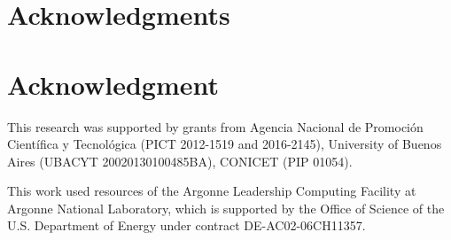 \documentclass[10pt,journal,compsoc]{IEEEtran}
\begin{document}
%





\ifCLASSOPTIONcompsoc
  \section*{Acknowledgments}
\else
  \section*{Acknowledgment}
\fi


This research was supported by grants from Agencia Nacional de Promoci\'on Cient\'ifica y Tecnol\'ogica (PICT 2012-1519 and 2016-2145), University of Buenos Aires (UBACYT 20020130100485BA), CONICET (PIP 01054).

This work used resources of the Argonne Leadership Computing Facility at Argonne National Laboratory, which is supported by the Office of Science of the U.S. Department of Energy under contract DE-AC02-06CH11357. 


\ifCLASSOPTIONcaptionsoff
  \newpage
\fi
\end{document}
